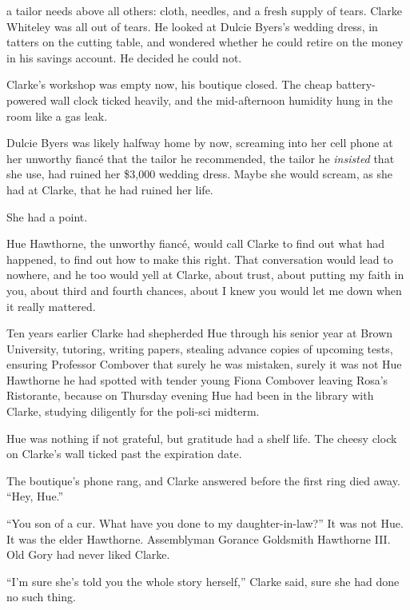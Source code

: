 \def\previewtitle{Tailor's Tears}
\def\previewauthor{Dale Hartley Emery}

\previewannouncementpage{\previewtitle}
\previewpage{\previewtitle}

 a tailor needs above all others: cloth, needles,
and a fresh supply of tears. Clarke Whiteley was all out of tears. He
looked at Dulcie Byers's wedding dress, in tatters on the cutting table,
and wondered whether he could retire on the money in his savings
account. He decided he could not.

Clarke's workshop was empty now, his boutique closed. The cheap
battery-powered wall clock ticked heavily, and the mid-afternoon
humidity hung in the room like a gas leak.

Dulcie Byers was likely halfway home by now, screaming into her cell
phone at her unworthy fianc\'e that the tailor he recommended, the tailor
he \emph{insisted} that she use, had ruined her \$3,000 wedding dress.
Maybe she would scream, as she had at Clarke, that he had ruined her
life.

She had a point.

Hue Hawthorne, the unworthy fianc\'e, would call Clarke to find out what
had happened, to find out how to make this right. That conversation
would lead to nowhere, and he too would yell at Clarke, about trust,
about putting my faith in you, about third and fourth chances, about I
knew you would let me down when it really mattered.

Ten years earlier Clarke had shepherded Hue through his senior year at
Brown University, tutoring, writing papers, stealing advance copies of
upcoming tests, ensuring Professor Combover that surely he was mistaken,
surely it was not Hue Hawthorne he had spotted with tender young Fiona
Combover leaving Rosa's Ristorante, because on Thursday evening Hue had
been in the library with Clarke, studying diligently for the poli-sci
midterm.

Hue was nothing if not grateful, but gratitude had a shelf life. The
cheesy clock on Clarke's wall ticked past the expiration date.

The boutique's phone rang, and Clarke answered before the first ring
died away. ``Hey, Hue.''

``You son of a cur. What have you done to my daughter-in-law?'' It was not
Hue. It was the elder Hawthorne. Assemblyman Gorance Goldsmith Hawthorne
III. Old Gory had never liked Clarke.

``I'm sure she's told you the whole story herself,'' Clarke said, sure she
had done no such thing.

